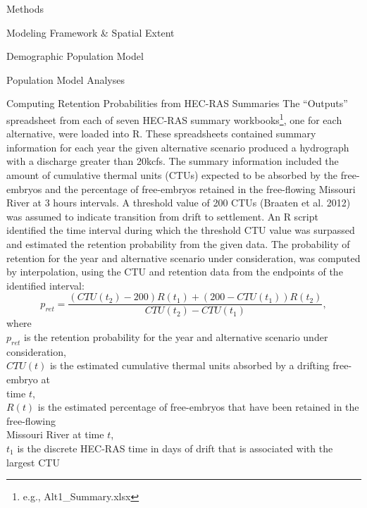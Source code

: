 \documentclass[12pt]{article}
\begin{document}
\begin{section}{Methods}
\begin{subsection}{Modeling Framework \& Spatial Extent}
\begin{subsubsection}{Demographic Population Model}
\end{subsubsection}

\end{subsection}

\begin{subsection}{Population Model Analyses}

\begin{subsubsection}{Computing Retention Probabilities from HEC-RAS Summaries}
The ``Outputs'' spreadsheet from each of seven HEC-RAS summary workbooks\footnote{e.g., Alt1\_Summary.xlsx}, one for each alternative, were loaded into R.  These spreadsheets contained summary information for each year the given alternative scenario produced a hydrograph with a discharge greater than 20kcfs.  The summary information included the amount of cumulative thermal units (CTUs) expected to be absorbed by the free-embryos and the percentage of free-embryos retained in the free-flowing Missouri River at 3 hours intervals.  A threshold value of 200 CTUs (Braaten et al. 2012) was assumed to indicate transition from drift to settlement.  An R script identified the time interval during which the threshold CTU value was surpassed and estimated the retention probability from the given data.  The probability of retention for the year and alternative scenario under consideration, was computed by interpolation, using the CTU and retention data from the endpoints of the identified interval:
\begin{equation}
p_{ret}=\frac{(CTU(t_2)-200)R(t_1)+(200-CTU(t_1))R(t_2)}{CTU(t_2)-CTU(t_1)},
\end{equation}  
where\\
\hspace*{0.5cm}$p_{ret}$ is the retention probability for the year and alternative scenario under consideration,\\
\hspace*{0.5cm}$CTU(t)$ is the estimated cumulative thermal units absorbed by a drifting free-embryo at\\
\hspace*{1.5cm}time $t$,\\
\hspace*{0.5cm}$R(t)$ is the estimated percentage of free-embryos that have been retained in the free-flowing\\
\hspace*{1.5cm}Missouri River at time $t$,\\
\hspace*{0.5cm}$t_1$ is the discrete HEC-RAS time in days of drift that is associated with the largest CTU\\ 

\end{subsubsection}
\end{subsection}
\end{section}
\end{document}
